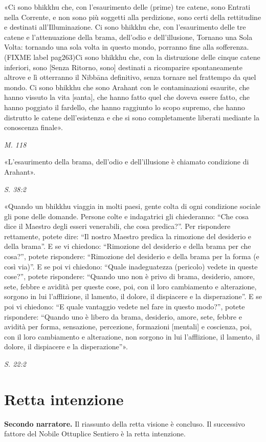 «Ci sono bhikkhu che, con l’esaurimento delle (prime) tre catene, sono
Entrati nella Corrente, e non sono più soggetti alla perdizione, sono
certi della rettitudine e destinati all’Illuminazione. Ci sono bhikkhu
che, con l’esaurimento delle tre catene e l’attenuazione della brama,
dell’odio e dell’illusione, Tornano una Sola Volta: tornando una sola
volta in questo mondo, porranno fine alla sofferenza. (FIXME label pag263)Ci sono bhikkhu
che, con la distruzione delle cinque catene inferiori, sono [Senza
Ritorno, sono] destinati a ricomparire spontaneamente altrove e lì
otterranno il Nibbāna definitivo, senza tornare nel frattempo da quel
mondo. Ci sono bhikkhu che sono Arahant con le contaminazioni esaurite,
che hanno vissuto la vita [santa], che hanno fatto quel che doveva
essere fatto, che hanno poggiato il fardello, che hanno raggiunto lo
scopo supremo, che hanno distrutto le catene dell’esistenza e che si
sono completamente liberati mediante la conoscenza finale».


\emph{M. 118}


«L’esaurimento della brama, dell’odio e dell’illusione è chiamato
condizione di Arahant».


\emph{S. 38:2}


«Quando un bhikkhu viaggia in molti paesi, gente colta di ogni
condizione sociale gli pone delle domande. Persone colte e indagatrici
gli chiederanno: “Che cosa dice il Maestro degli esseri venerabili, che
cosa predica?”. Per rispondere rettamente, potete dire: “Il nostro
Maestro predica la rimozione del desiderio e della brama”. E se vi
chiedono: “Rimozione del desiderio e della brama per che cosa?”, potete
rispondere: “Rimozione del desiderio e della brama per la forma (e così
via)”. E se poi vi chiedono: “Quale inadeguatezza (pericolo) vedete in
queste cose?”, potete rispondere: “Quando uno non è privo di brama,
desiderio, amore, sete, febbre e avidità per queste cose, poi, con il
loro cambiamento e alterazione, sorgono in lui l’afflizione, il lamento,
il dolore, il dispiacere e la disperazione”. E se poi vi chiedono: “E
quale vantaggio vedete nel fare in questo modo?”, potete rispondere:
“Quando uno è libero da brama, desiderio, amore, sete, febbre e avidità
per forma, sensazione, percezione, formazioni [mentali] e coscienza,
poi, con il loro cambiamento e alterazione, non sorgono in lui
l’afflizione, il lamento, il dolore, il dispiacere e la disperazione”».


\emph{S. 22:2}


\hypertarget{x-retta-intenzione}{\section*{Retta intenzione}}
\textbf{Secondo narratore.} Il riassunto della retta visione è concluso. Il
successivo fattore del Nobile Ottuplice Sentiero è la retta intenzione.


